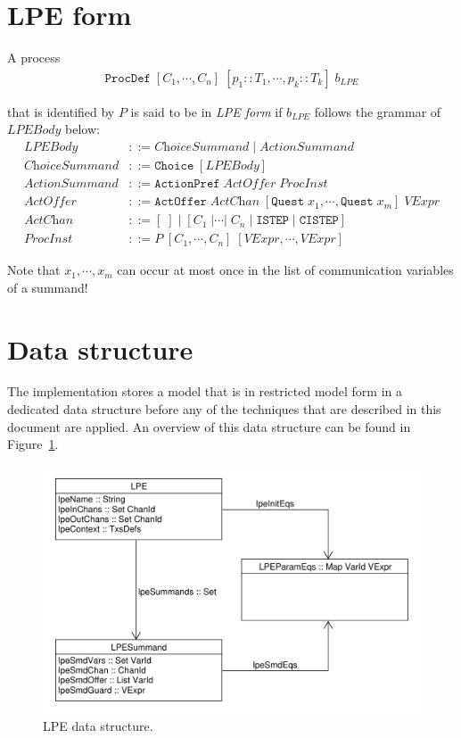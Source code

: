 \section{LPE form} \label{sec:lpeform}

A \txs{} process
\begin{align*}
\texttt{ProcDef} \; [C_1, \cdots{}, C_n] \; [p_1 :: T_1, \cdots{}, p_k :: T_k] \; b_\textit{LPE}
\end{align*}

that is identified by $P$ is said to be in \emph{LPE form} if $b_\textit{LPE}$ follows the grammar of $\textit{LPEBody}$ below:
\begin{align*}
\textit{LPEBody} &::= \textit{ChoiceSummand} \;|\; \textit{ActionSummand} \\
\textit{ChoiceSummand} &::= \texttt{Choice} \; [ \textit{LPEBody} ] \\
\textit{ActionSummand} &::= \texttt{ActionPref} \; \textit{ActOffer} \; \textit{ProcInst} \\
\textit{ActOffer} &::= \texttt{ActOffer} \; \textit{ActChan} \; [\texttt{Quest} \; x_1, \cdots{}, \texttt{Quest} \; x_m] \; \textit{VExpr} \\
\textit{ActChan} &::= [\;] \;|\; [C_1 \;| \cdots{} |\; C_n \;|\; \texttt{ISTEP} \;|\; \texttt{CISTEP}] \\
\textit{ProcInst} &::= P \; [C_1, \cdots{}, C_n] \; [\textit{VExpr}, \cdots{}, \textit{VExpr}]
\end{align*}

Note that $x_1, \cdots{}, x_m$ can occur at most once in the list of communication variables of a summand!

\section{Data structure}

The implementation stores a \txs{} model that is in restricted model form in a dedicated data structure before any of the techniques that are described in this document are applied.
An overview of this data structure can be found in Figure~\ref{fig:lpedatastructure}.

\begin{figure}[!ht]
\begin{center}
\includegraphics[width=0.7\linewidth]{images/lpe-types}
\caption{LPE data structure.}
\label{fig:lpedatastructure}
\end{center}
\end{figure}

